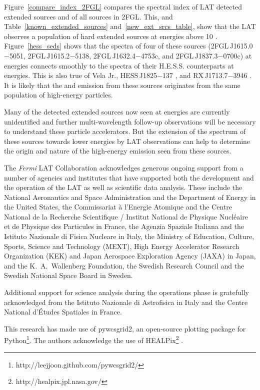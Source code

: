 \documentclass[12pt,preprint]{aastex}
\newcommand{\gev}{\text{GeV}\xspace}
\newcommand{\tev}{\text{TeV}\xspace}
\newcommand{\newtext}[1]{{\bfseries \color{red}#1}}
\begin{document}
Figure~\ref{compare_index_2FGL} compares the spectral index
of LAT detected extended sources and of all sources in 2FGL. This,
and Table~\ref{known_extended_sources} and~\ref{new_ext_srcs_table},
show that the LAT observes a population of hard extended sources at
energies above 10 \gev.  Figure~\ref{hess_seds} shows that the
spectra of four of these sources (2FGL\,J1615.0$-$5051, 2FGL\,J1615.2$-$5138,
2FGL\,J1632.4$-$4753c, and 2FGL\,J1837.3$-$0700c)  
at \gev energies
connects smoothly to the spectra of their H.E.S.S. counterparts at \tev
energies. This is also true of Vela
Jr., HESS\,J1825$-$137 \citep{fermi_hess_j1825}, and RX\,J1713.7$-$3946
\citep{rx_j1713_lat}.  It is likely that the \gev and \tev emission
from these sources originates from the same population of high-energy
particles.

Many of the \tev detected extended sources now seen at \gev energies are
currently unidentified and further multi-wavelength follow-up observations
will be necessary to understand these particle accelerators.  But the
extension of the spectrum of these \tev sources towards lower energies
by LAT observations can help to determine the origin and nature of the
high-energy emission seen from these sources.


\newtext{

The \textit{Fermi} LAT Collaboration acknowledges generous ongoing support
from a number of agencies and institutes that have supported both the
development and the operation of the LAT as well as scientific data analysis.
These include the National Aeronautics and Space Administration and the
Department of Energy in the United States, the Commissariat \`a l'Energie Atomique
and the Centre National de la Recherche Scientifique / Institut National de Physique
Nucl\'eaire et de Physique des Particules in France, the Agenzia Spaziale Italiana
and the Istituto Nazionale di Fisica Nucleare in Italy, the Ministry of Education,
Culture, Sports, Science and Technology (MEXT), High Energy Accelerator Research
Organization (KEK) and Japan Aerospace Exploration Agency (JAXA) in Japan, and
the K.~A.~Wallenberg Foundation, the Swedish Research Council and the
Swedish National Space Board in Sweden.

Additional support for science analysis during the operations phase is gratefully
acknowledged from the Istituto Nazionale di Astrofisica in Italy and the Centre National d'\'Etudes Spatiales in France.

This research has made use of
pywcsgrid2, an open-source plotting package for
Python\footnote{http://leejjoon.github.com/pywcsgrid2/}. The authors acknowledge the
use of HEALPix\footnote{http://healpix.jpl.nasa.gov/} \citep{healpix}.

}
\end{document}
